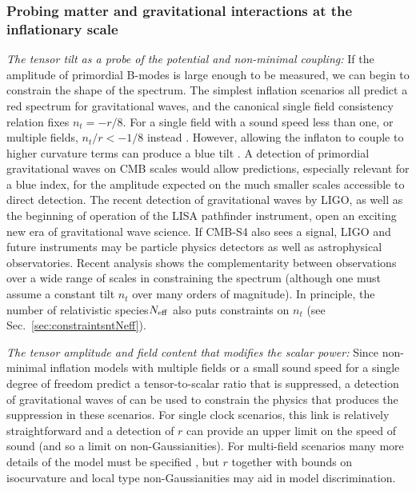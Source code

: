 \subsubsection{Probing matter and gravitational interactions at the inflationary scale}\label{subsubsec:Interactions}

{\it The tensor tilt as a probe of the potential and non-minimal coupling:} If the amplitude of primordial B-modes is large enough to be measured, we can begin to constrain the shape of the spectrum. The simplest inflation scenarios all predict a red spectrum for gravitational waves, and the canonical single field consistency relation fixes $n_t=-r/8$. For a single field with a sound speed less than one, or multiple fields, $n_t/r<-1/8$ instead \cite{Price:2014ufa}. However, allowing the inflaton to couple to higher curvature terms can produce a blue tilt \cite{Baumann:2015xxa}. A detection of primordial gravitational waves on CMB scales would allow predictions, especially relevant for a blue index, for the amplitude expected on the much smaller scales accessible to direct detection. The recent detection of gravitational waves by LIGO, as well as the beginning of operation of the LISA pathfinder instrument, open an exciting new era of gravitational wave science. If CMB-S4 also sees a signal, LIGO and future instruments may be particle physics detectors as well as astrophysical observatories. Recent analysis \cite{Meerburg:2015zua,Lasky:2015lej} shows the complementarity between observations over a wide range of scales in constraining the spectrum (although one must assume a constant tilt $n_t$ over many orders of magnitude). In principle, the number of relativistic species$N_{\rm eff}$ also puts constraints on $n_t$ \cite{Meerburg:2015zua} (see Sec.~\ref{sec:constraintsntNeff}). 

{\it The tensor amplitude and field content that modifies the scalar power:} Since non-minimal inflation models with multiple fields or a small sound speed for a single degree of freedom predict a tensor-to-scalar ratio that is suppressed, a detection of gravitational waves of can be used to constrain the physics that produces the suppression in these scenarios. For single clock scenarios, this link is relatively straightforward \cite{Baumann:2014cja} and a detection of $r$ can provide an upper limit on the speed of sound (and so a limit on non-Gaussianities). For multi-field scenarios many more details of the model must be specified \cite{Turzynski:2014tza}, but $r$ together with bounds on isocurvature and local type non-Gaussianities may aid in model discrimination. 

